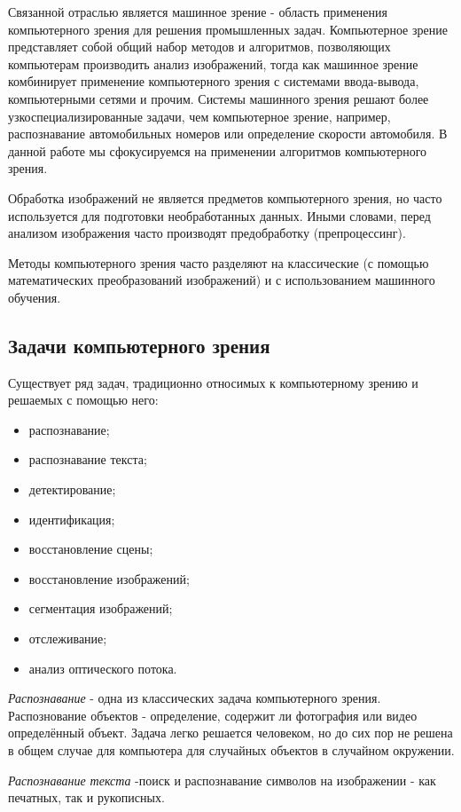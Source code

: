 \documentclass[times]{itmo-student-thesis}
\begin{document}
Связанной отраслью является машинное зрение  - область применения компьютерного зрения для решения промышленных задач.  Компьютерное зрение представляет собой общий набор методов и алгоритмов, позволяющих компьютерам производить анализ изображений, тогда как машинное зрение комбинирует применение компьютерного зрения с системами ввода-вывода, компьютерными сетями и прочим.  Системы машинного зрения решают более узкоспециализированные задачи, чем компьютерное зрение, например, распознавание автомобильных номеров или определение скорости автомобиля. В данной работе мы сфокусируемся на применении алгоритмов компьютерного зрения.

Обработка изображений не является предметов компьютерного зрения, но часто используется для подготовки необработанных данных. Иными словами, перед анализом изображения часто производят предобработку (препроцессинг).

Методы компьютерного зрения часто разделяют на классические (с помощью математических преобразований изображений) и с использованием машинного обучения.  


\subsection{Задачи компьютерного зрения}\label{cvtasks}
Существует ряд задач, традиционно относимых к компьютерному зрению и решаемых с помощью него:
\begin{itemize}
\item распознавание;
\item распознавание текста;
\item детектирование;
\item идентификация;
\item восстановление сцены;
\item восстановление изображений;
\item сегментация изображений;
\item отслеживание;
\item анализ оптического потока.
\end{itemize}

\textit{Распознавание} - одна из  классических задача компьютерного зрения. Распознование объектов - определение, содержит ли фотография или видео определённый объект. Задача легко решается человеком, но до сих пор не решена в общем случае для компьютера для случайных объектов в случайном окружении. 


\textit{Распознавание текста} -поиск и распознавание символов на изображении - как печатных, так и рукописных. 
\end{document}
